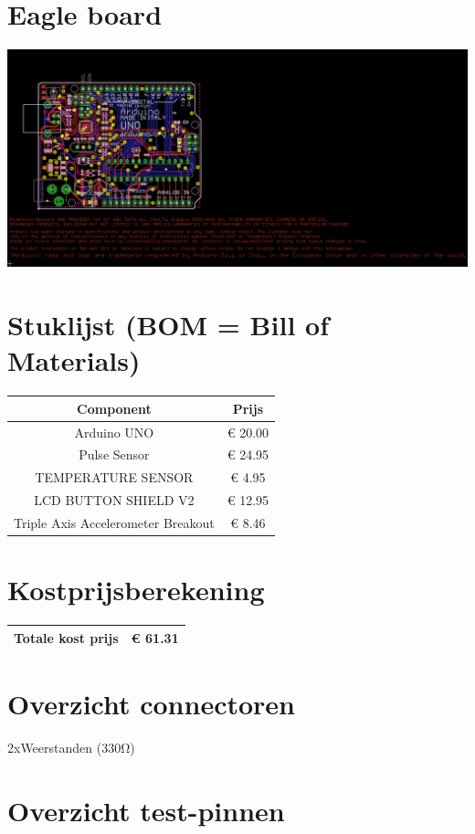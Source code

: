 \documentclass[a4paper]{report}
\begin{document}
\section{Eagle board}
\includegraphics[width=\textwidth]{ArduinoUno_Board}

\section{Stuklijst (BOM = Bill of Materials)}
\begin{tabular}{|c|c|}
    \hline
    Component & Prijs\\
    \hline
    Arduino UNO                        & € 20.00\\
    Pulse Sensor                       & € 24.95\\
    TEMPERATURE SENSOR                 & €  4.95\\
    LCD BUTTON SHIELD V2               & € 12.95\\
    Triple Axis Accelerometer Breakout & €  8.46\\
    \hline
\end{tabular}

\section{Kostprijsberekening}
\begin{tabular}{|c|c|}
    \hline
    Totale kost prijs & € 61.31\\
    \hline
\end{tabular}

\section{Overzicht connectoren}
2xWeerstanden (330Ω)

\section{Overzicht test-pinnen}
\end{document}
